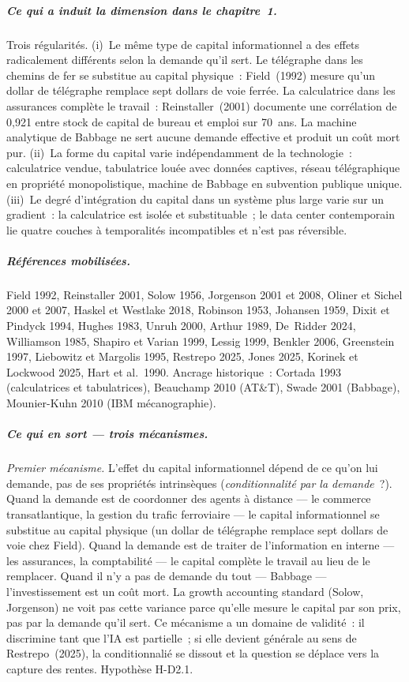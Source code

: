 \subparagraph{Ce qui a induit la dimension dans le chapitre~1.}
Trois régularités. (i)~Le même type de capital informationnel a des effets radicalement différents selon la demande qu'il sert. Le télégraphe dans les chemins de fer se substitue au capital physique~: Field~(1992) mesure qu'un dollar de télégraphe remplace sept dollars de voie ferrée. La calculatrice dans les assurances complète le travail~: Reinstaller~(2001) documente une corrélation de 0,921 entre stock de capital de bureau et emploi sur 70~ans. La machine analytique de Babbage ne sert aucune demande effective et produit un coût mort pur. (ii)~La forme du capital varie indépendamment de la technologie~: calculatrice vendue, tabulatrice louée avec données captives, réseau télégraphique en propriété monopolistique, machine de Babbage en subvention publique unique. (iii)~Le degré d'intégration du capital dans un système plus large varie sur un gradient~: la calculatrice est isolée et substituable~; le data center contemporain lie quatre couches à temporalités incompatibles et n'est pas réversible.

\subparagraph{Références mobilisées.}
Field 1992, Reinstaller 2001, Solow 1956, Jorgenson 2001 et 2008, Oliner et Sichel 2000 et 2007, Haskel et Westlake 2018, Robinson 1953, Johansen 1959, Dixit et Pindyck 1994, Hughes 1983, Unruh 2000, Arthur 1989, De~Ridder 2024, Williamson 1985, Shapiro et Varian 1999, Lessig 1999, Benkler 2006, Greenstein 1997, Liebowitz et Margolis 1995, Restrepo 2025, Jones 2025, Korinek et Lockwood 2025, Hart et al.\ 1990. Ancrage historique~: Cortada 1993 (calculatrices et tabulatrices), Beauchamp 2010 (AT\&T), Swade 2001 (Babbage), Mounier-Kuhn 2010 (IBM mécanographie).

\subparagraph{Ce qui en sort --- trois mécanismes.}

\emph{Premier mécanisme.} L'effet du capital informationnel dépend de ce qu'on lui demande, pas de ses propriétés intrinsèques (\emph{conditionnalité par la demande}~?). Quand la demande est de coordonner des agents à distance --- le commerce transatlantique, la gestion du trafic ferroviaire --- le capital informationnel se substitue au capital physique (un dollar de télégraphe remplace sept dollars de voie chez Field). Quand la demande est de traiter de l'information en interne --- les assurances, la comptabilité --- le capital complète le travail au lieu de le remplacer. Quand il n'y a pas de demande du tout --- Babbage --- l'investissement est un coût mort. La growth accounting standard (Solow, Jorgenson) ne voit pas cette variance parce qu'elle mesure le capital par son prix, pas par la demande qu'il sert. Ce mécanisme a un domaine de validité~: il discrimine tant que l'IA est partielle~; si elle devient générale au sens de Restrepo~(2025), la conditionnalié se dissout et la question se déplace vers la capture des rentes. Hypothèse H-D2.1.

